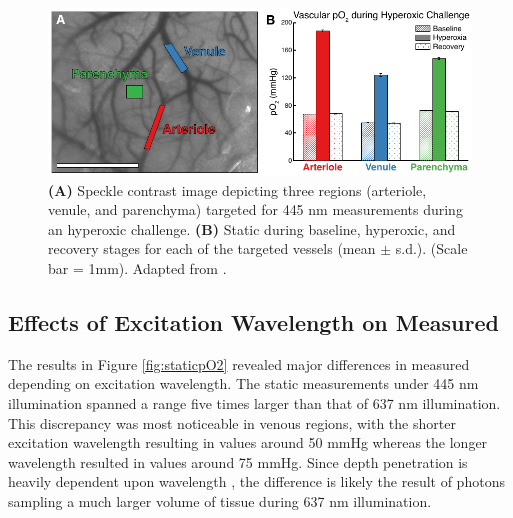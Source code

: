 \begin{figure}
    \includegraphics{figures/chapter_2/hyperoxicchallenge.pdf}
    \caption[ measurements from an ateriole, venule, and parenchyma during an hyperoxic challenge.]{
        \label{fig:hyperoxicchallenge}
        \textbf{(A)} Speckle contrast image depicting three regions (arteriole, venule, and parenchyma) targeted for 445 nm  measurements during an hyperoxic challenge. \textbf{(B)} Static  during baseline, hyperoxic, and recovery stages for each of the targeted vessels (mean $\pm$ s.d.). (Scale bar = 1mm). Adapted from \cite{Sullender:2018ff}.
    }
\end{figure}

\subsection{Effects of Excitation Wavelength on Measured }

The results in Figure \ref{fig:staticpO2} revealed major differences in measured  depending on excitation wavelength. The static  measurements under 445 nm illumination spanned a range five times larger than that of 637 nm illumination. This discrepancy was most noticeable in venous regions, with the shorter excitation wavelength resulting in  values around 50 mmHg whereas the longer wavelength resulted in values around 75 mmHg. Since depth penetration is heavily dependent upon wavelength \cite{Deng:2003kb}, the difference is likely the result of photons sampling a much larger volume of tissue during 637 nm illumination.

